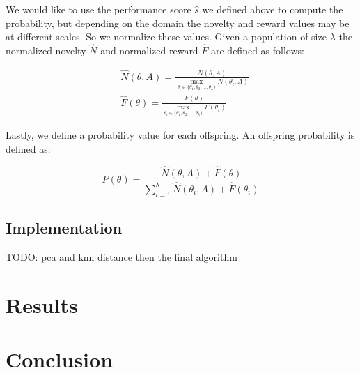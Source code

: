 \documentclass[11 pt, twocolumn]{article}
\newcommand{\todo}[1]{}
\renewcommand{\todo}[1]{{\color{red} TODO: {#1}}}
\begin{document}
We would like to use the performance score $\hat{s}$ we defined above to compute the probability, but depending on the domain the novelty and reward values may be at different scales. So we normalize these values. Given a population of size $\lambda$ the normalized novelty $\hat{N}$ and normalized reward $\hat{F}$ are defined as follows:

\begin{align*}
&\hat{N}(\theta,A)=\frac{N(\theta,A)}{\max_{\theta_i\in\{\theta_1,\theta_2,\dots,\theta_\lambda\}}N(\theta_i,A)}\\
&\hat{F}(\theta)=\frac{F(\theta)}{\max_{\theta_i\in\{\theta_1,\theta_2,\dots,\theta_\lambda\}}F(\theta_i)}
\end{align*}

Lastly, we define a probability value for each offspring. An offspring probability is defined as:

\begin{equation*}
P(\theta)=\frac{\hat{N}(\theta,A)+\hat{F}(\theta)}{\sum_{i=1}^{\lambda}\hat{N}(\theta_i,A)+\hat{F}(\theta_i)}
\end{equation*}

\subsection{Implementation}
\todo{pca and knn distance then the final algorithm}

\section{Results}
\section{Conclusion}

 

\end{document}
